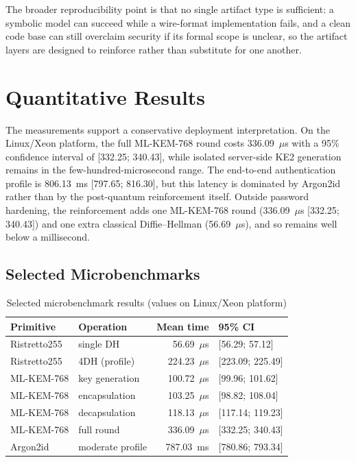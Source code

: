 \documentclass[conference]{IEEEtran}
\begin{document}
The broader reproducibility point is that no single artifact type is sufficient: a symbolic model can succeed while a wire-format implementation fails, and a clean code base can still overclaim security if its formal scope is unclear, so the artifact layers are designed to reinforce rather than substitute for one another.

\section{Quantitative Results}\label{sec:results}

The measurements support a conservative deployment interpretation. {\color{blue}On the Linux/Xeon platform, the full ML-KEM-768 round costs 336.09~$\mu$s with a 95\% confidence interval of [332.25; 340.43], while isolated server-side KE2 generation remains in the few-hundred-microsecond range. The end-to-end authentication profile is 806.13~ms [797.65; 816.30], but this latency is dominated by Argon2id \cite{argon2rfc2021} rather than by the post-quantum reinforcement itself. Outside password hardening, the reinforcement adds one ML-KEM-768 round (336.09~$\mu$s [332.25; 340.43]) and one extra classical Diffie--Hellman (56.69~$\mu$s), and so remains well below a millisecond.}

\subsection{Selected Microbenchmarks}

\begin{table}[t]
\caption{Selected microbenchmark results {\color{blue}(values on Linux/Xeon platform)}}
\label{tab:acit-microbench}
\centering
\scriptsize
\begin{tabularx}{\columnwidth}{@{}L{1.6cm}L{1.45cm}rY@{}}
\toprule
Primitive & Operation & Mean time & 95\% CI \\
\midrule
Ristretto255 & single DH & 56.69~$\mu$s & [56.29; 57.12] \\
Ristretto255 & 4DH (profile) & 224.23~$\mu$s & [223.09; 225.49] \\
ML-KEM-768 & key generation & 100.72~$\mu$s & [99.96; 101.62] \\
ML-KEM-768 & encapsulation & 103.25~$\mu$s & [98.82; 108.04] \\
ML-KEM-768 & decapsulation & 118.13~$\mu$s & [117.14; 119.23] \\
ML-KEM-768 & full round & 336.09~$\mu$s & [332.25; 340.43] \\
Argon2id & moderate profile & 787.03~ms & [780.86; 793.34] \\
\bottomrule
\end{tabularx}
\end{table}
\end{document}
